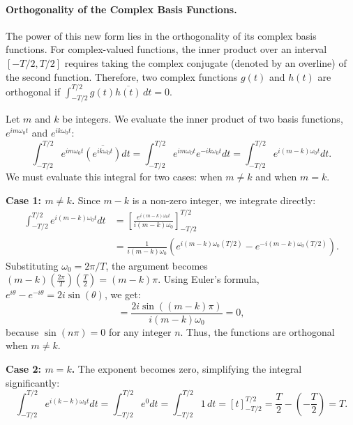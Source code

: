 \documentclass{article}
\begin{document}
\paragraph{Orthogonality of the Complex Basis Functions.}
The power of this new form lies in the orthogonality of its complex basis functions. For complex-valued functions, the inner product over an interval $[-T/2, T/2]$ requires taking the complex conjugate (denoted by an overline) of the second function. Therefore, two complex functions $g(t)$ and $h(t)$ are orthogonal if $\int_{-T/2}^{T/2} g(t)\overline{h(t)}\,dt = 0$. 

Let $m$ and $k$ be integers. We evaluate the inner product of two basis functions, $e^{im\omega_0 t}$ and $e^{ik\omega_0 t}$:
\begin{equation}
    \int_{-T/2}^{T/2} e^{im\omega_0 t} \overline{\left(e^{ik\omega_0 t}\right)} dt = \int_{-T/2}^{T/2} e^{im\omega_0t} e^{-ik\omega_0t} dt = \int_{-T/2}^{T/2} e^{i(m-k)\omega_0t} dt.
\end{equation}
We must evaluate this integral for two cases: when $m \neq k$ and when $m = k$.

\textbf{Case 1: $m \neq k$.} Since $m-k$ is a non-zero integer, we integrate directly:
\begin{align*}
    \int_{-T/2}^{T/2} e^{i(m-k)\omega_0t} dt &= \left[ \frac{e^{i(m-k)\omega_0t}}{i(m-k)\omega_0} \right]_{-T/2}^{T/2} \\
    &= \frac{1}{i(m-k)\omega_0} \left( e^{i(m-k)\omega_0(T/2)} - e^{-i(m-k)\omega_0(T/2)} \right).
\end{align*}
Substituting $\omega_0 = 2\pi/T$, the argument becomes $(m-k)(\frac{2\pi}{T})(\frac{T}{2}) = (m-k)\pi$. Using Euler's formula, $e^{i\theta} - e^{-i\theta} = 2i\sin(\theta)$, we get:
\begin{equation*}
    = \frac{2i\sin((m-k)\pi)}{i(m-k)\omega_0} = 0,
\end{equation*}
because $\sin(n\pi) = 0$ for any integer $n$. Thus, the functions are orthogonal when $m \neq k$.

\textbf{Case 2: $m = k$.} The exponent becomes zero, simplifying the integral significantly:
\begin{equation*}
    \int_{-T/2}^{T/2} e^{i(k-k)\omega_0t} dt = \int_{-T/2}^{T/2} e^0 dt = \int_{-T/2}^{T/2} 1 \, dt = \left[ t \right]_{-T/2}^{T/2} = \frac{T}{2} - \left(-\frac{T}{2}\right) = T.
\end{equation*}
\end{document}
